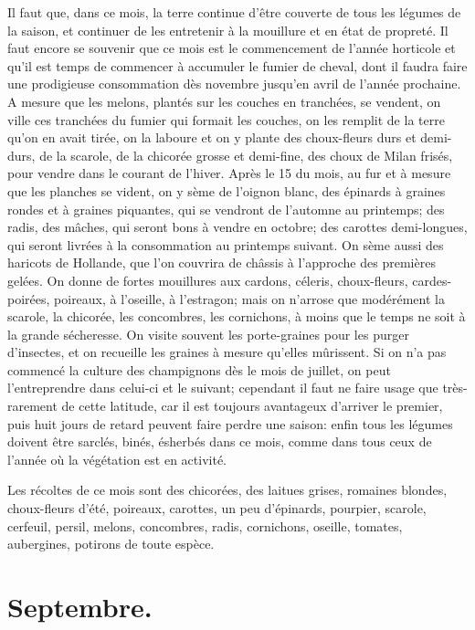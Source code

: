 \documentclass[10pt,a4paper]{book}
\begin{document}
Il faut que, dans ce mois, la terre continue d'être couverte de tous les légumes de la saison, et continuer de les entretenir à la mouillure et en état de propreté. Il faut encore se souvenir que ce mois est le commencement de l'année horticole et qu'il est temps de commencer à accumuler le fumier de cheval, dont il faudra faire une prodigieuse consommation dès novembre jusqu'en avril de l'année prochaine. A mesure que les melons, plantés sur les couches en tranchées, se vendent, on ville ces tranchées du fumier qui formait les couches, on les remplit de la terre qu'on en avait tirée, on la laboure et on y plante des choux-fleurs durs et demi-durs, de la scarole, de la chicorée grosse et demi-fine, des choux de Milan frisés, pour vendre dans le courant de l'hiver. Après le 15 du mois, au fur et à mesure que les planches se vident, on y sème de l'oignon blanc, des épinards à graines rondes et à graines piquantes, qui se vendront de l'automne au printemps; des radis, des mâches, qui seront bons à vendre en octobre; des carottes demi-longues, qui seront livrées à la consommation au printemps suivant. On sème aussi des haricots de Hollande, que l'on couvrira de châssis à l'approche des premières gelées. On donne de fortes mouillures aux cardons, céleris, choux-fleurs, cardes-poirées, poireaux, à l'oseille, à l'estragon; mais on n'arrose que modérément la scarole, la chicorée, les concombres, les cornichons, à moins que le temps ne soit à la grande sécheresse. On visite souvent les porte-graines pour les purger d'insectes, et on recueille les graines à mesure qu'elles mûrissent. Si on n'a pas commencé la culture des champignons dès le mois de juillet, on peut l'entreprendre dans celui-ci et le suivant; cependant il faut ne faire usage que très-rarement de cette latitude, car il est toujours avantageux d'arriver le premier, puis huit jours de retard peuvent faire perdre une saison: enfin tous les légumes doivent être sarclés, binés, ésherbés dans ce mois, comme dans tous ceux de l'année où la végétation est en activité.

Les récoltes de ce mois sont des chicorées, des laitues grises, romaines blondes, choux-fleurs d'été, poireaux, carottes, un peu d'épinards, pourpier, scarole, cerfeuil, persil, melons, concombres, radis, cornichons, oseille, tomates, aubergines, potirons de toute espèce.

\section{Septembre.}
\end{document}
